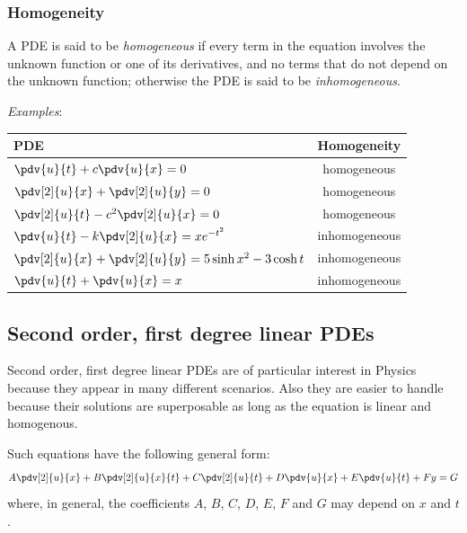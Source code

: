         \subsubsection{Homogeneity}
            A PDE is said to be \textit{homogeneous} if every term in the equation involves the unknown function or one of its derivatives, and no terms that do not depend on the unknown function; otherwise the PDE is said to be \textit{inhomogeneous}.

            \newpage
            \textit{Examples}:
            \renewcommand{\arraystretch}{2.2}
            \begin{table}[h!]
                \centering
                \begin{tabular}{p{}c}
                    \toprule[1.5pt]
                    \textbf{PDE} & \textbf{Homogeneity} \\ \midrule[1.5pt]
                    {$\pdv{u}{t}+c\pdv{u}{x}=0$} & {homogeneous} \\ %
                    {$\pdv[2]{u}{x}+\pdv[2]{u}{y}=0$} & {homogeneous} \\ %
                    {$\pdv[2]{u}{t}-c^2\pdv[2]{u}{x}=0$} & {homogeneous} \\ %
                    {$\pdv{u}{t}-k\pdv[2]{u}{x}=xe^{-t^2}$} & {inhomogeneous} \\ %
                    {$\pdv[2]{u}{x}+\pdv[2]{u}{y}=5\sinh{x^2}-3\cosh{t}$} & {inhomogeneous} \\
                    {$\pdv{u}{t}+\pdv{u}{x}=x$} & {inhomogeneous} \\
                    \bottomrule[1.5pt]
                \end{tabular}
            \end{table}

    \subsection{Second order, first degree linear PDEs}
        Second order, first degree linear PDEs are of particular interest in Physics because they appear in many different scenarios. Also they are easier to handle because their solutions are superposable as long as the equation is linear and homogenous.

        Such equations have the following general form:
        \begin{align*}
            A\pdv[2]{u}{x}+B\pdv[2]{u}{x}{t}+C\pdv[2]{u}{t}+D\pdv{u}{x}+E\pdv{u}{t}+Fy=G
        \end{align*}
        where, in general, the coefficients $A$, $B$, $C$, $D$, $E$, $F$ and $G$ may depend on $x$ and $t$.

